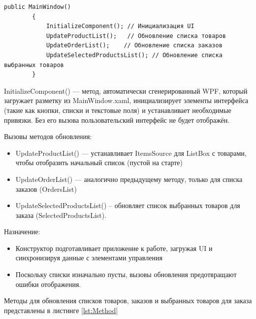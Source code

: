 \documentclass[12pt]{article}
\newcommand{\colorGIT}[1]{\textcolor{CtpGreen}{#1}}
\begin{document}
\begin{lstlisting}[style=csharp_catppuccin, caption=Пример кода для класса \colorGIT{\href{https://github.com/WebMasterIT/Csharp_Labs/blob/ec375afd16c0647b337cf3d8a79c8bef904fc1be/3lab/StoreManager/MainWindow.xaml.cs\#L24-L30}{Main}}, label=lst:Main2]
        public MainWindow()
        {
            InitializeComponent(); // Инициализация UI
            UpdateProductList();   // Обновление списка товаров
            UpdateOrderList();    // Обновление списка заказов
            UpdateSelectedProductsList(); // Обновление списка выбранных товаров
        }
\end{lstlisting}

InitializeComponent() — метод, автоматически сгенерированный WPF, который загружает разметку из MainWindow.xaml, инициализирует элементы интерфейса (такие как кнопки, списки и текстовые поля) и устанавливает необходимые привязки. Без его вызова пользовательский интерфейс не будет отображён.

Вызовы методов обновления:
\begin{itemize}
	\item UpdateProductList() — устанавливает ItemsSource для ListBox с товарами, чтобы отобразить начальный список (пустой на старте)
	\item UpdateOrderList() — аналогично предыдущему методу, только для списка заказов (OrdersList)
	\item UpdateSelectedProductsList() -- обновляет список выбранных товаров для заказа (Selected\-Products\-List).
\end{itemize}

Назначение:
\begin{itemize}
	\item Конструктор подготавливает приложение к работе, загружая UI и синхронизируя данные с элементами управления
	\item Поскольку списки изначально пусты, вызовы обновления предотвращают ошибки отображения.
\end{itemize}

\pagebreak

Методы для обновления списков товаров, заказов и выбранных товаров для заказа
представлены в листинге \ref{lst:Method}
\end{document}

